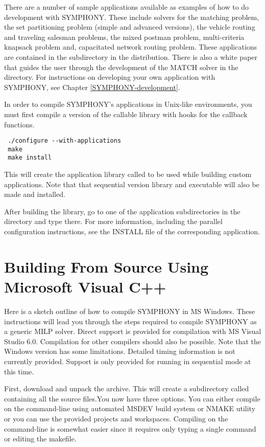 There are a number of sample applications available as examples of how to do
development with SYMPHONY. These include solvers for the matching problem, the
set partitioning problem (simple and advanced versions), the vehicle routing
and traveling salesman problems, the mixed postman problem, multi-criteria
knapsack problem and, capacitated network routing problem. These applications
are contained in the  subdirectory in the
distribution. There is also a white paper that guides the user through the
development of the MATCH solver in the  directory. For
instructions on developing your own application with SYMPHONY, see Chapter
\ref{SYMPHONY-development}.

In order to compile SYMPHONY's applications in Unix-like environments, you
must first compile a version of the callable library with hooks for the
callback functions. {\color{Brown}
\begin{verbatim}
 ./configure --with-applications 
 make 
 make install
\end{verbatim}
}
This will create the application library called  to be used while
building custom applications. Note that that sequential version library and
executable will also be made and installed.

After building the library, go to one of the application subdirectories in the
 directory and type  there. For
more information, including the parallel configuration instructions, see the
INSTALL file of the corresponding application.

\section{Building From Source Using Microsoft Visual C++}
\label{getting_started_windows}

Here is a sketch outline of how to compile SYMPHONY in MS Windows.
These instructions will lead you through the steps required to compile
SYMPHONY as a generic MILP solver. Direct support
is provided for compilation with MS Visual Studio 6.0. Compilation for other
compilers should also be possible. Note that the Windows version has some
limitations. Detailed timing information is not currently provided. Support is
only provided for running in sequential mode at this time.

First, download  and unpack the archive. This will
create a subdirectory called  containing all the source
files.You now 
have three options. You can either compile on the command-line using automated 
MSDEV build system or NMAKE utility or you can use the provided projects and 
workspaces. Compiling on the command-line is somewhat easier since it requires 
only typing a single command or editing the makefile. 

